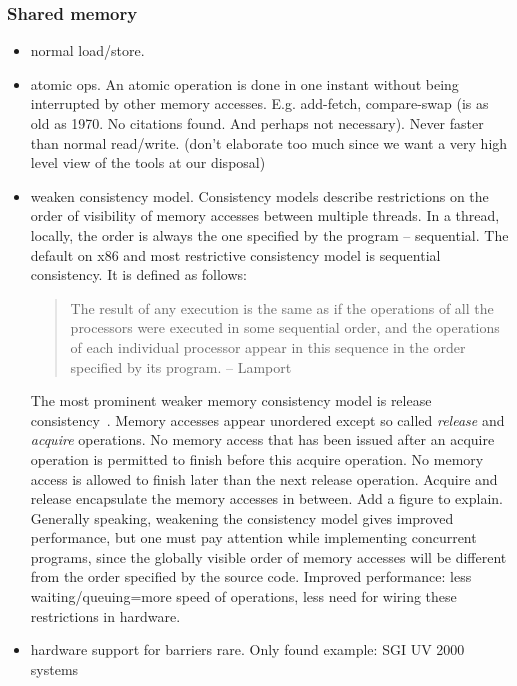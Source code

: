 \documentclass[a4paper, 10pt]{article}
\begin{document}
\begin{enumerate}
\subsubsection{Shared memory}
\label{sssec:existing-means-shared}
\begin{itemize}
	\item normal load/store.
	\item atomic ops. An atomic operation is done in one instant without being interrupted by other memory accesses. E.g. add-fetch, compare-swap (is as old as 1970. No citations found. And perhaps not necessary). Never faster than normal read/write. (don't elaborate too much since we want a very high level view of the tools at our disposal)
	\item weaken consistency model. Consistency models describe restrictions on the order of visibility of memory accesses between multiple threads. In a thread, locally, the order is always the one specified by the program -- sequential. The default on x86 and most restrictive consistency model is sequential consistency. It is defined as follows:
		\begin{quote}
			The result of any execution is the same as if the operations of all the processors were executed in some sequential order, and the operations of each individual processor appear in this sequence in the order specified by its program. -- Lamport~\cite{sequentialconsistency}
		\end{quote}
		The most prominent weaker memory consistency model is release consistency~\cite{gha90}. Memory accesses appear unordered except so called \emph{release} and \emph{acquire} operations. No memory access that has been issued after an acquire operation is permitted to finish before this acquire operation. No memory access is allowed to finish later than the next release operation. Acquire and release encapsulate the memory accesses in between. Add a figure to explain. Generally speaking, weakening the consistency model gives improved performance, but one must pay attention while implementing concurrent programs, since the globally visible order of memory accesses will be different from the order specified by the source code. Improved performance: less waiting/queuing=more speed of operations, less need for wiring these restrictions in hardware.
	\item hardware support for barriers rare. Only found example: SGI UV 2000 systems\cite{sgiuv2000}
\end{itemize}


\end{enumerate}
\end{document}
